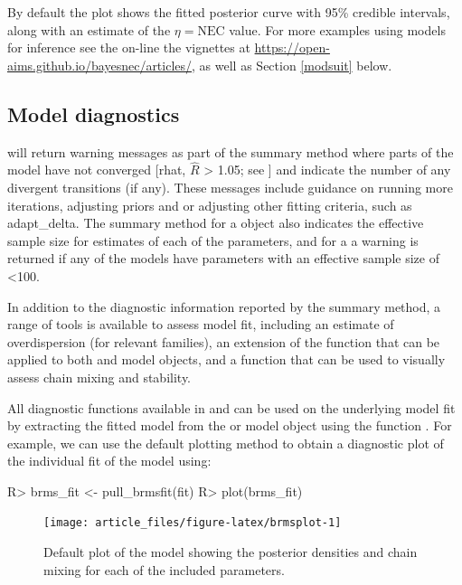 \documentclass[
  shortnames]{jss}
\begin{document}
By default the plot shows the fitted posterior curve with 95\% credible intervals, along with an estimate of the \(\eta = \text{NEC}\) value. For more examples using  models for inference see the on-line the vignettes at \url{https://open-aims.github.io/bayesnec/articles/}, as well as Section \ref{modsuit} below.

\subsection[Model diagnostics]{Model diagnostics}\label{moddiag}

 will return warning messages as part of the summary method where parts of the model have not converged {[}rhat, \(\widehat{R}\) \textgreater{} 1.05; see \citet{vehtari2021rank}{]} and indicate the number of any divergent transitions (if any). These messages include guidance on running more iterations, adjusting priors and or adjusting other fitting criteria, such as adapt\_delta. The summary method for a  object also indicates the effective sample size for estimates of each of the parameters, and for a  a warning is returned if any of the models have parameters with an effective sample size of \textless100.

In addition to the diagnostic information reported by the summary method, a range of tools is available to assess model fit, including an estimate of overdispersion (for relevant families), an extension of the   function that can be applied to both  and  model objects, and a function  that can be used to visually assess chain mixing and stability.

All diagnostic functions available in  and  can be used on the underlying  model fit by extracting the fitted  model from the  or  model object using the function . For example, we can use the default  plotting method to obtain a diagnostic plot of the individual fit of the  model using:

\begin{CodeChunk}
\begin{CodeInput}
R> brms_fit <- pull_brmsfit(fit)
R> plot(brms_fit)
\end{CodeInput}
\begin{figure}[!ht]

{\centering \texttt{[image: article\_files/figure-latex/brmsplot-1]} 

}

\caption[Default  plot of the  model showing the posterior densities and chain mixing for each of the included parameters]{Default  plot of the  model showing the posterior densities and chain mixing for each of the included parameters.}\label{fig:brmsplot}
\end{figure}
\end{CodeChunk}
\end{document}
